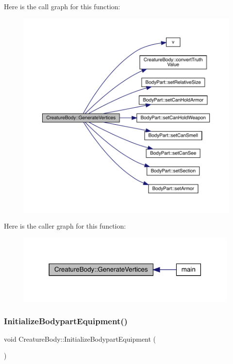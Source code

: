 Here is the call graph for this function\+:
\nopagebreak
\begin{figure}[H]
\begin{center}
\leavevmode
\includegraphics[width=350pt]{da/d7d/class_creature_body_af7047fb13005abbb9a816c0dd64af873_cgraph}
\end{center}
\end{figure}
Here is the caller graph for this function\+:
\nopagebreak
\begin{figure}[H]
\begin{center}
\leavevmode
\includegraphics[width=314pt]{da/d7d/class_creature_body_af7047fb13005abbb9a816c0dd64af873_icgraph}
\end{center}
\end{figure}
\mbox{\label{class_creature_body_af2b152c045862bb0fbc370b444bf98f0}} 
\subsubsection{\texorpdfstring{Initialize\+Bodypart\+Equipment()}{InitializeBodypartEquipment()}}
{\footnotesize\ttfamily void Creature\+Body\+::\+Initialize\+Bodypart\+Equipment (\begin{DoxyParamCaption}{ }\end{DoxyParamCaption})}

